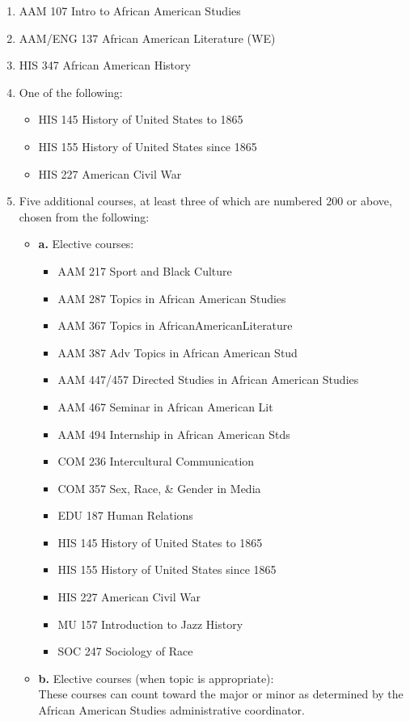 \documentclass[
  letterpaper,
]{scrbook}
\providecommand{\tightlist}{%
  \setlength{\itemsep}{0pt}\setlength{\parskip}{0pt}}
\begin{document}
\begin{enumerate}
\def\labelenumi{\arabic{enumi}.}
\tightlist
\item
  AAM 107 Intro to African American Studies
\item
  AAM/ENG 137 African American Literature (WE)
\item
  HIS 347 African American History
\item
  One of the following:

  \begin{itemize}
  \tightlist
  \item
    HIS 145 History of United States to 1865
  \item
    HIS 155 History of United States since 1865
  \item
    HIS 227 American Civil War
  \end{itemize}
\item
  Five additional courses, at least three of which are numbered 200 or
  above, chosen from the following:

  \begin{itemize}
  \item
    \textbf{a.} Elective courses:

    \begin{itemize}
    \tightlist
    \item
      AAM 217 Sport and Black Culture
    \item
      AAM 287 Topics in African American Studies
    \item
      AAM 367 Topics in AfricanAmericanLiterature
    \item
      AAM 387 Adv Topics in African American Stud
    \item
      AAM 447/457 Directed Studies in African American Studies
    \item
      AAM 467 Seminar in African American Lit
    \item
      AAM 494 Internship in African American Stds
    \item
      COM 236 Intercultural Communication
    \item
      COM 357 Sex, Race, \& Gender in Media
    \item
      EDU 187 Human Relations
    \item
      HIS 145 History of United States to 1865
    \item
      HIS 155 History of United States since 1865
    \item
      HIS 227 American Civil War
    \item
      MU 157 Introduction to Jazz History
    \item
      SOC 247 Sociology of Race
    \end{itemize}
  \item
    \textbf{b.} Elective courses (when topic is appropriate): ~\\
    These courses can count toward the major or minor as determined by
    the African American Studies administrative coordinator.


\end{itemize}
\end{enumerate}
\end{document}
